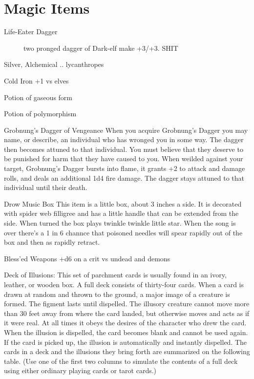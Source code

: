 
\section{Magic Items}

\begin{description}
\item[Life-Eater Dagger] two pronged dagger of Dark-elf make +3/+3. SHIT

\end{description}




Silver, Alchemical .. lycanthropes

Cold Iron +1 vs elves

Potion of gaseous form

Potion of polymorphism

Grobnung's Dagger of Vengeance
When you acquire Grobnung's Dagger you may name, or describe, an individual who has wronged you in some way. The dagger then becomes attuned to that individual.  You must believe that they deserve to be punished for harm that they have caused to you.  When weilded against your target, Grobnung's Dagger bursts into flame, it grants +2 to attack and damage rolls, and deals an additional 1d4 fire damage.  The dagger stays attuned to that individual until their death.


Drow Music Box
This item is a little box, about 3 inches a side.  It is decorated with spider web filligree and has a little handle that can be extended from the side.  When turned the box plays twinkle twinkle little star.  When the song is over there's a 1 in 6 channce that poisoned needles will spear rapidly out of the box and then as rapidly retract.


Bless'ed Weapons
+d6 on a crit vs undead and demons 



Deck of Illusions: This set of parchment cards is usually found in an ivory, leather, or wooden box. A full deck consists of thirty-four cards. When a card is drawn at random and thrown to the ground, a major image of a creature is formed. The figment lasts until dispelled. The illusory creature cannot move more than 30 feet away from where the card landed, but otherwise moves and acts as if it were real. At all times it obeys the desires of the character who drew the card. When the illusion is dispelled, the card becomes blank and cannot be used again. If the card is picked up, the illusion is automatically and instantly dispelled. The cards in a deck and the illusions they bring forth are summarized on the following table. (Use one of the first two columns to simulate the contents of a full deck using either ordinary playing cards or tarot cards.)


